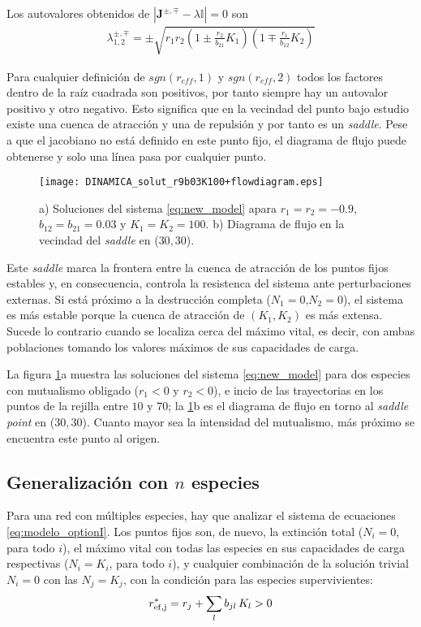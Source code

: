 Los autovalores obtenidos de $\left| \mathbf{J}^{\pm,\mp}-\lambda\mathbb{I}  \right|=0$ son
\begin{align*}
  \lambda^{\pm,\mp}_{1,2}= \pm \sqrt{r_1 r_2 \left(1\pm\frac{r_2}{b_{21}}K_1 \right)\left(1\mp\frac{r_1}{b_{12}}K_2 \right)}
\end{align*}

Para cualquier definición de $sgn(r_{eff},1)$ y $sgn(r_{eff},2)$ todos los factores dentro de la raíz cuadrada son positivos, por tanto siempre hay un autovalor positivo y otro negativo. Esto significa que en la vecindad del punto bajo estudio existe una cuenca de atracción y una de repulsión y por tanto es un \textit{saddle}. Pese a que el jacobiano no está definido en este punto fijo, el diagrama de flujo puede obtenerse y solo una línea pasa por cualquier punto.

\begin{figure}[h!]
\centering
\texttt{[image: DINAMICA\_solut\_r9b03K100+flowdiagram.eps]}
\caption {a) Soluciones del sistema \ref{eq:new_model} apara $r_1=r_2=-0.9$, $b_{12}=b_{21}=0.03$ y $K_1=K_2=100$. b) Diagrama de flujo en la vecindad del \textit{saddle} en ($30,30$).}
\label{fig:stab1_phase}
\end{figure}

Este \textit{saddle} marca la frontera entre la cuenca de atracción de los puntos fijos estables y, en consecuencia, controla la resistenca del sistema ante perturbaciones externas. Si está próximo a la destrucción completa ($N_1=0$,$N_2=0$), el sistema es más estable porque la cuenca de atracción de $(K_1,K_2)$ es más extensa. Sucede lo contrario cuando se localiza cerca del máximo vital, es decir, con ambas poblaciones tomando los valores máximos de sus capacidades de carga.

La figura \ref{fig:stab1_phase}a muestra las soluciones del sistema \ref{eq:new_model} para dos especies con mutualismo obligado ($r_1<0$ y $r_2<0$), e incio de las trayectorias en los puntos de la rejilla entre $10$ y $70$; la \ref{fig:stab1_phase}b es el diagrama de flujo en torno al \textit{saddle point} en ($30,30$). Cuanto mayor sea la intensidad del mutualismo, más próximo se encuentra este punto al origen.


\subsection{Generalización con $n$ especies}

Para una red con múltiples especies, hay que analizar el sistema de ecuaciones \ref{eq:modelo_optionI}. Los puntos fijos son, de nuevo, la extinción total ($N_i=0$, para todo $i$), el máximo vital con todas las especies en sus capacidades de carga respectivas ($N_i=K_i$, para todo $i$), y cualquier combinación de la solución trivial $N_{i}=0$ con las $N_{j}= K_{j}$, con la condición para las especies supervivientes:
\begin{equation}
\displaystyle r_{\rm{ef},j}^{\ast} = r_{j} + \sum_{l} b_{jl}\, K_{l} > 0 \\
\label{eq:condit_reff_K}
\end{equation}

